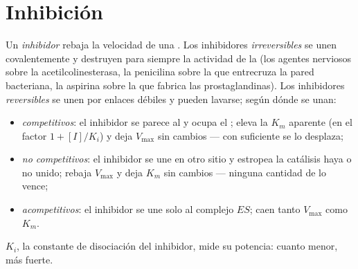 \section{Inhibición}

\begin{definition}[Inhibidores]\label{def:b1:enzymes:inhibitors}
Un \emph{inhibidor} rebaja la velocidad de una
. Los inhibidores \emph{irreversibles} se unen covalentemente y
destruyen para siempre la actividad de la  (los agentes nerviosos
sobre la acetilcolinesterasa, la penicilina sobre la  que entrecruza
la pared bacteriana, la aspirina sobre la  que fabrica las
prostaglandinas). Los inhibidores \emph{reversibles} se unen por enlaces
débiles y pueden lavarse; según dónde se unan:
\begin{itemize}
  \item \emph{competitivos}: el inhibidor se
        parece al  y ocupa el ; eleva la $K_m$
        aparente (en el factor $1 + [I]/K_i$) y deja $V_{\max}$ sin cambios
        --- con suficiente  se lo desplaza;
  \item \emph{no competitivos}: el inhibidor se une en otro sitio y
        estropea la catálisis haya o no  unido; rebaja $V_{\max}$ y
        deja $K_m$ sin cambios --- ninguna cantidad de  lo vence;
  \item \emph{acompetitivos}: el inhibidor se une solo al complejo $ES$;
        caen tanto $V_{\max}$ como $K_m$.
\end{itemize}
$K_i$, la constante de disociación del inhibidor, mide su potencia: cuanto
menor, más fuerte.
\end{definition}

